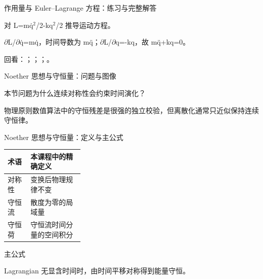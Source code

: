 \begin{frame}[t]{作用量与 Euler--Lagrange 方程：练习与完整解答}
\footnotesize
\begin{block}{}对 L=mq̇\ensuremath{^{2}}/\allowbreak{}2-kq\ensuremath{^{2}}/\allowbreak{}2 推导运动方程。\end{block}
\begin{exampleblock}{}\ensuremath{\partial}L/\allowbreak{}\ensuremath{\partial}q̇=mq̇，时间导数为 mq̈；\ensuremath{\partial}L/\allowbreak{}\ensuremath{\partial}q=-kq，故 mq̈+kq=0。\end{exampleblock}
\vfill
\scriptsize 回看：；；；。
\end{frame}

\begin{frame}[t]{Noether 思想与守恒量：问题与图像}
\footnotesize
\begin{block}{本节问题}为什么连续对称性会约束时间演化？\end{block}
\begin{block}{物理原则}\quad 数值算法中的守恒残差是很强的独立校验，但离散化通常只近似保持连续守恒律。\end{block}
\end{frame}

\begin{frame}[t]{Noether 思想与守恒量：定义与主公式}
\footnotesize\begin{tabularx}{\linewidth}{p{0.30\linewidth}Y}
\toprule 术语 & 本课程中的精确定义\\\midrule
{} 对称性 & 变换后物理规律不变\\
 守恒流 & 散度为零的局域量\\
 守恒荷 & 守恒流时间分量的空间积分\\
\bottomrule\end{tabularx}\vspace{0.15cm}
\begin{block}{ 主公式}\centering{}\end{block}
Lagrangian 无显含时间时，由时间平移对称得到能量守恒。
\end{frame}

